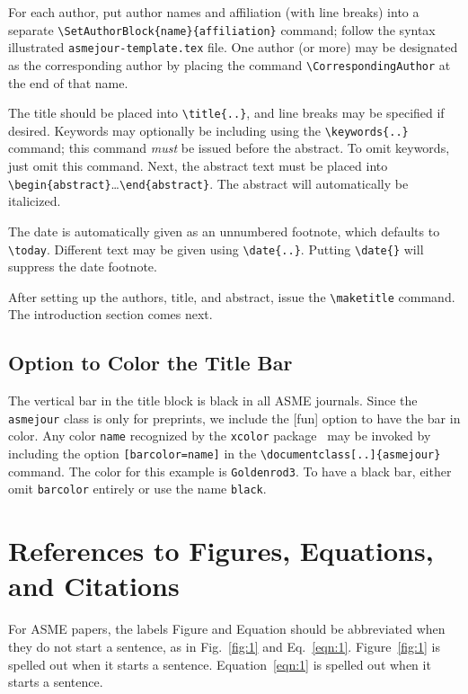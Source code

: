 \documentclass[subscriptcorrection,upint,varvw,barcolor=Goldenrod3,mathalfa=cal=euler,balance,hyphenate,french,pdf-a]{asmejour} %
\begin{document}
For each author, put author names and affiliation (with line breaks) into a separate \verb|\SetAuthorBlock{name}{affiliation}| command; follow the syntax illustrated \texttt{asmejour-template.tex} file.  One author (or more) may be designated as the corresponding author  by placing the command \verb|\CorrespondingAuthor| at the end of that name.  

The title should be placed into \verb|\title{..}|, and line breaks may be specified if desired. Keywords may optionally be including using the \verb|\keywords{..}| command; this command \textit{must} be issued before the abstract. To omit keywords, just omit this command. Next, the abstract text must be placed into \verb|\begin{abstract}|\ldots\verb|\end{abstract}|. The abstract will automatically be italicized. 

The date is automatically given as an unnumbered footnote, which defaults to \verb|\today|. Different text may be given using \verb|\date{..}|. Putting \verb|\date{}| will suppress the date footnote.

After setting up the authors, title, and abstract, issue the \verb|\maketitle| command. The introduction section comes next. 

\subsection{Option to Color the Title Bar}
The vertical bar in the title block is black in all ASME journals. Since the \texttt{asmejour} class is only for preprints, we include the [fun] option to have the bar in color. Any color \texttt{name} recognized by the \texttt{xcolor} package~\cite{kern} may be invoked by including the option \texttt{[barcolor=name]} in the \verb|\documentclass[..]{asmejour}| command. The color for this example is \texttt{Goldenrod3}. To have a black bar, either omit \texttt{barcolor} entirely or use the name \texttt{black}.


\section{References to Figures, Equations, and Citations}

For ASME papers, the labels Figure and Equation should be abbreviated when they do not start a sentence, as in Fig.~\ref{fig:1} and Eq.~\eqref{eqn:1}. Figure~\ref{fig:1} is spelled out when it starts a sentence. Equation~\eqref{eqn:1} is spelled out when it starts a sentence. 
\end{document}
